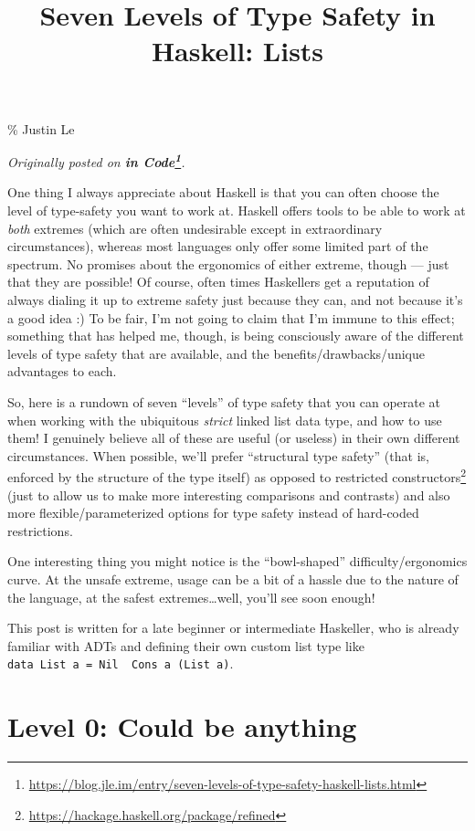 \documentclass[]{article}
\title{Seven Levels of Type Safety in Haskell: Lists}
\renewcommand{\href}[2]{#2\footnote{\url{#1}}}
\begin{document}
\maketitle

\% Justin Le

\emph{Originally posted on
\textbf{\href{https://blog.jle.im/entry/seven-levels-of-type-safety-haskell-lists.html}{in
Code}}.}

One thing I always appreciate about Haskell is that you can often choose the
level of type-safety you want to work at. Haskell offers tools to be able to
work at \emph{both} extremes (which are often undesirable except in
extraordinary circumstances), whereas most languages only offer some limited
part of the spectrum. No promises about the ergonomics of either extreme, though
--- just that they are possible! Of course, often times Haskellers get a
reputation of always dialing it up to extreme safety just because they can, and
not because it's a good idea :) To be fair, I'm not going to claim that I'm
immune to this effect; something that has helped me, though, is being
consciously aware of the different levels of type safety that are available, and
the benefits/drawbacks/unique advantages to each.

So, here is a rundown of seven ``levels'' of type safety that you can operate at
when working with the ubiquitous \emph{strict} linked list data type, and how to
use them! I genuinely believe all of these are useful (or useless) in their own
different circumstances. When possible, we'll prefer ``structural type safety''
(that is, enforced by the structure of the type itself) as opposed to
\href{https://hackage.haskell.org/package/refined}{restricted constructors}
(just to allow us to make more interesting comparisons and contrasts) and also
more flexible/parameterized options for type safety instead of hard-coded
restrictions.

One interesting thing you might notice is the ``bowl-shaped''
difficulty/ergonomics curve. At the unsafe extreme, usage can be a bit of a
hassle due to the nature of the language, at the safest extremes\ldots well,
you'll see soon enough!

This post is written for a late beginner or intermediate Haskeller, who is
already familiar with ADTs and defining their own custom list type like
\texttt{data\ List\ a\ =\ Nil\ \textbar{}\ Cons\ a\ (List\ a)}.

\section{Level 0: Could be anything}\label{level-0-could-be-anything}
\end{document}
